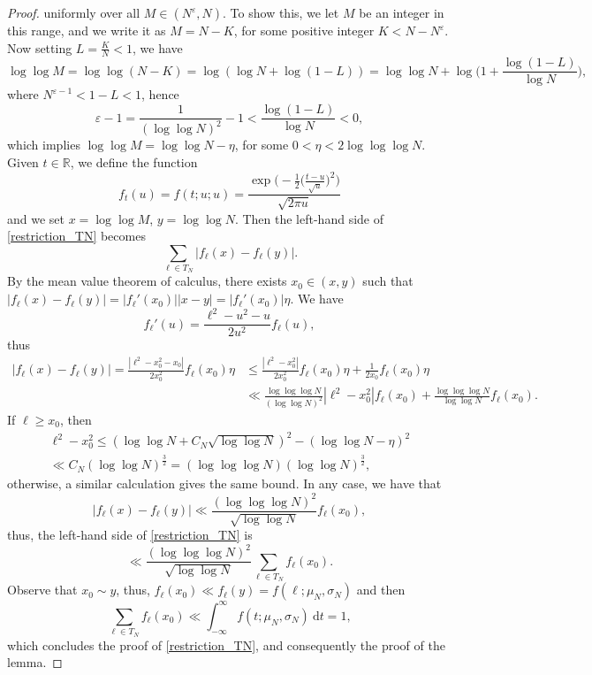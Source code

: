 \documentclass[letter,11pt]{article}
\theoremstyle{plain} %
\theoremstyle{definition} %
\theoremstyle{plain}
\theoremstyle{plain}
\theoremstyle{plain}
\numberwithin{equation}{section}
\newcommand{\R}{\mathbb{R}}
\renewcommand{\epsilon}{\varepsilon}
\renewcommand{\leq}{\leqslant}
\renewcommand{\geq}{\geqslant}
\renewcommand{\d}{~\mathrm{d}}
\newcommand{\1}{\mathbbm{1}}
\begin{document}
\begin{proof}
    uniformly over all $M\in(N^\epsilon,N)$.
    To show this, we let $M$ be an integer in this range, and we write it as $M = N - K$, for some positive integer $K<N-N^\epsilon$. Now setting $L=\frac{K}{N}<1$, we have
    $$\log\log{M} = \log\log(N-K) = \log(\log{N}+\log(1-L))
    = \log\log{N} + \log\bigg(1 + \frac{\log(1-L)}{\log{N}}\bigg),$$
    where $N^{\epsilon-1}<1-L<1$, hence 
    $$\epsilon-1 = \frac{1}{(\log\log{N})^2}-1 < \frac{\log(1-L)}{\log{N}}<0,$$
    which implies
    $\log\log{M} = \log\log{N} - \eta$, for some $0<\eta<2\log\log\log{N}$.
    Given $t\in\R$, we define the function
    $$f_t(u) = f(t;u;u)
    = \frac{\exp\Big(-\frac{1}{2}\Big(\frac{t-u}{\sqrt{u}}\Big)^2\Big)}{\sqrt{2\pi u}}$$
    and we set $x=\log\log{M}$, $y=\log\log{N}$. Then the left-hand side of \eqref{restriction_TN} becomes
    $$\sum_{\ell\in T_N}|f_\ell(x) - f_\ell(y)|.$$
    By the mean value theorem of calculus, there exists $x_0\in(x,y)$
    such that $|f_\ell(x) - f_\ell(y)| = |f_\ell'(x_0)||x-y| = |f_\ell'(x_0)|\eta$. We have 
    $$f_\ell'(u) = \frac{\ell^2-u^2-u}{2u^2}f_\ell(u),$$
    thus
    \begin{align*}
    |f_\ell(x)-f_\ell(y)| = \frac{|\ell^2-x_0^2-x_0|}{2x_0^2}f_\ell(x_0)\eta
    & \leq \frac{|\ell^2-x_0^2|}{2x_0^2}f_\ell(x_0)\eta + \frac{1}{2x_0}f_\ell(x_0)\eta \\
    & \ll \frac{\log\log\log{N}}{(\log\log{N})^2}|\ell^2-x_0^2|f_\ell(x_0)
    + \frac{\log\log\log{N}}{\log\log{N}}f_\ell(x_0).
    \end{align*}
    If $\ell\geq x_0$, then 
    \begin{multline*}
        \ell^2-x_0^2 \leq (\log\log{N}+C_N\sqrt{\log\log{N}})^2-(\log\log{N}-\eta)^2 \\
        \ll C_N(\log\log{N})^\frac{3}{2} = (\log\log\log{N})(\log\log{N})^\frac{3}{2},
    \end{multline*}
    otherwise, a similar calculation gives the same bound. In any case, we have that
    $$|f_\ell(x)-f_\ell(y)| \ll \frac{(\log\log\log{N})^2}{\sqrt{\log\log{N}}}f_\ell(x_0),$$
    thus, the left-hand side of \eqref{restriction_TN} is 
    $$\ll \frac{(\log\log\log{N})^2}{\sqrt{\log\log{N}}} \sum_{\ell\in T_N}f_\ell(x_0).$$
    Observe that $x_0\sim y$, thus, $f_\ell(x_0)\ll f_\ell(y) = f(\ell;\mu_N,\sigma_N)$ and then
    $$\sum_{\ell\in T_N} f_\ell(x_0) \ll \int_{-\infty}^\infty f(t;\mu_N,\sigma_N) \d t = 1,$$
    which concludes the proof of \eqref{restriction_TN}, and consequently the proof of the lemma.
\end{proof}
\end{document}
